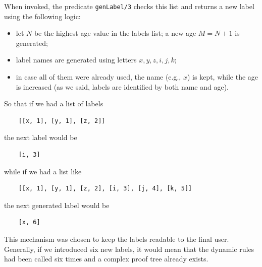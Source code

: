 \documentclass[a4paper, 11pt, oneside]{duthesis}
\begin{document}
When invoked, the predicate \texttt{genLabel/3} checks this list and returns a new label using the following logic:
\begin{itemize}
\item let $N$ be the highest age value in the labels list; a new age $M = N + 1$ is generated;
\item label names are generated using letters $x,y,z,i,j,k$;
\item in case all of them were already used, the name (e.g., $x$) is kept, while the age is increased (as we said, labels are identified by both name and age).
\end{itemize}
So that if we had a list of labels
\begin{verbatim}
    [[x, 1], [y, 1], [z, 2]]
\end{verbatim}
the next label would be
\begin{verbatim}
    [i, 3]
\end{verbatim}
while if we had a list like
\begin{verbatim}
    [[x, 1], [y, 1], [z, 2], [i, 3], [j, 4], [k, 5]]
\end{verbatim}
the next generated label would be
\begin{verbatim}
    [x, 6]
\end{verbatim}

This mechanism was chosen to keep the labels readable to the final user.
Generally, if we introduced six new labels, it would mean that the dynamic rules had been called six times and a complex proof tree already exists.
\end{document}
